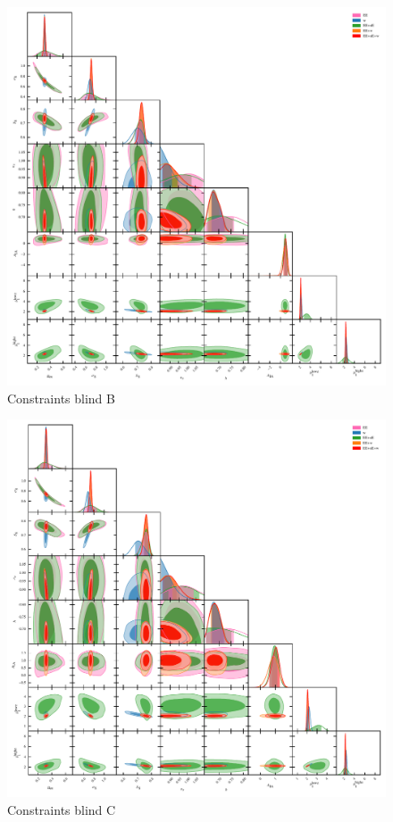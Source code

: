 \begin{figure}
	\begin{center}
		\includegraphics[width=\textwidth]{Parameter_Plots/omegam_sigma8_s8_ns_h_a_ia_b1l_b1h_blind_B}
		\caption{Constraints blind B}
		\label{fig:cosmology-params-all}
	\end{center}
\end{figure}

\begin{figure}
	\begin{center}
		\includegraphics[width=\textwidth]{Parameter_Plots/omegam_sigma8_s8_ns_h_a_ia_b1l_b1h_blind_C}
		\caption{Constraints blind C}
		\label{fig:cosmology-params-all}
	\end{center}
\end{figure}

